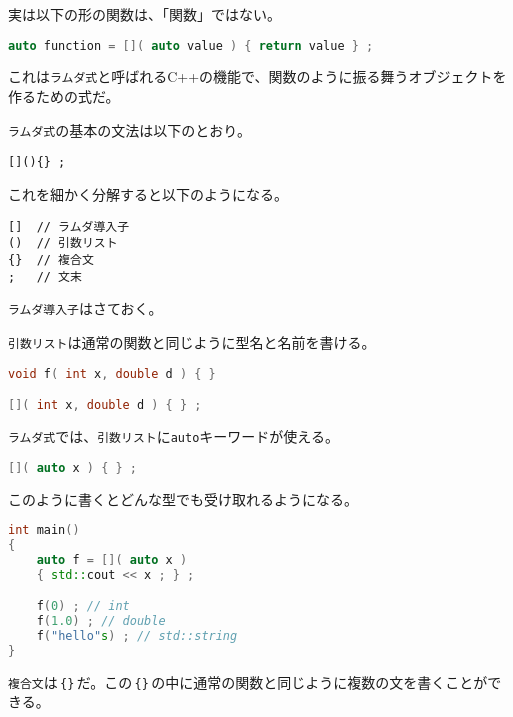 
実は以下の形の関数は、「関数」ではない。

\begin{lstlisting}[language={C++}]
auto function = []( auto value ) { return value } ;
\end{lstlisting}

これは\texttt{ラムダ式}と呼ばれるC++の機能で、関数のように振る舞うオブジェクトを作るための式だ。


\texttt{ラムダ式}の基本の文法は以下のとおり。

\begin{lstlisting}[style=grammar]
[](){} ;
\end{lstlisting}

これを細かく分解すると以下のようになる。

\begin{lstlisting}[style=grammar]
[]  // ラムダ導入子
()  // 引数リスト
{}  // 複合文
;   // 文末
\end{lstlisting}

\texttt{ラムダ導入子}はさておく。

\texttt{引数リスト}は通常の関数と同じように型名と名前を書ける。

\begin{lstlisting}[language={C++}]
void f( int x, double d ) { }

[]( int x, double d ) { } ;
\end{lstlisting}

\texttt{ラムダ式}では、\texttt{引数リスト}に\texttt{auto}キーワードが使える。

\begin{lstlisting}[language={C++}]
[]( auto x ) { } ;
\end{lstlisting}

このように書くとどんな型でも受け取れるようになる。

\begin{lstlisting}[language={C++}]
int main()
{
    auto f = []( auto x )
    { std::cout << x ; } ;

    f(0) ; // int
    f(1.0) ; // double
    f("hello"s) ; // std::string
}
\end{lstlisting}

\texttt{複合文}は\,\texttt{\{\}}\,だ。この\,\texttt{\{\}}\,の中に通常の関数と同じように複数の文を書くことができる。

